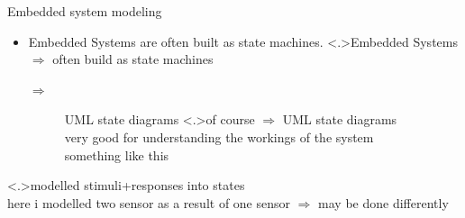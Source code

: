 \documentclass[ngerman={babel}, utf8, bigger, t, xcolor={table,dvipsnames}, ompress, hyperref={bookmarks,colorlinks},red]{beamer}
\begin{document}
\begin{frame}{Embedded system modeling}
	\begin{itemize}
		\item Embedded Systems are often built as state machines.
		\note<.>{Embedded Systems $\Rightarrow$ often build as state machines}
		\begin{description}
			\item[ $\Rightarrow$] UML state diagrams
			\note<.>{of course $\Rightarrow$ UML state diagrams \\ very good for understanding the workings of the system \\something like this}
		\end{description}
	\end{itemize}
	 {modelled stimuli+responses into states \\ here i modelled two sensor as a result of one sensor $\Rightarrow$ may be done differently}
\end{frame}
\end{document}
